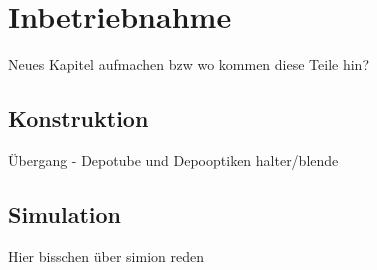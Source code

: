 \chapter{Inbetriebnahme}
Neues Kapitel aufmachen bzw wo kommen diese Teile hin?
\section{Konstruktion}
Übergang - Depotube und Depooptiken halter/blende
\section{Simulation}
Hier bisschen über simion reden

